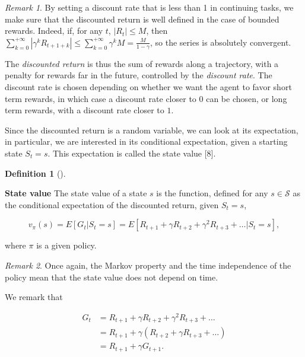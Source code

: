 \documentclass[
  letterpaper,
]{report}
\theoremstyle{plain}
\theoremstyle{definition}
\theoremstyle{definition}
\newtheorem{definition}{Definition}[chapter]
\theoremstyle{remark}
\newtheorem*{remark}{Remark}
\begin{document}
\begin{remark}

By setting a discount rate that is less than 1 in continuing tasks, we
make sure that the discounted return is well defined in the case of
bounded rewards. Indeed, if, for any \(t\), \(|R_t|\leq M\), then
\(\sum_{k=0}^{+\infty}|\gamma^k R_{t+1+k}| \leq \sum_{k=0}^{+\infty}\gamma^k M = \frac{M}{1-\gamma}\),
so the series is absolutely convergent.

\end{remark}

The \emph{discounted return} is thus the sum of rewards along a
trajectory, with a penalty for rewards far in the future, controlled by
the \emph{discount rate}. The discount rate is chosen depending on
whether we want the agent to favor short term rewards, in which case a
discount rate closer to \(0\) can be chosen, or long term rewards, with
a discount rate closer to \(1\).

Since the discounted return is a random variable, we can look at its
expectation, in particular, we are interested in its conditional
expectation, given a starting state \(S_t = s\). This expectation is
called the state value {[}8{]}.

\leavevmode{}%
\begin{definition}[]\label{def-state_value}

\textbf{State value} The state value of a state \(s\) is the function,
defined for any \(s\in\mathcal{S}\) as the conditional expectation of
the discounted return, given \(S_t = s\),

\[
v_\pi(s) = E[G_t|S_t = s] = E[R_{t+1} + \gamma R_{t+2} + \gamma^2 R_{t+3} + \dots | S_t = s],
\]

where \(\pi\) is a given policy.

\end{definition}

\begin{remark}

Once again, the Markov property and the time independence of the policy
mean that the state value does not depend on time.

\end{remark}

We remark that

\begin{align}   
G_t &= R_{t+1} + \gamma R_{t+2} + \gamma^2 R_{t+3} + \dots \nonumber\\
&=R_{t+1} + \gamma \left(R_{t+2} + \gamma R_{t+3}+ \dots \right) \nonumber\\
&=R_{t+1} + \gamma G_{t+1}.
\end{align}
\end{document}
